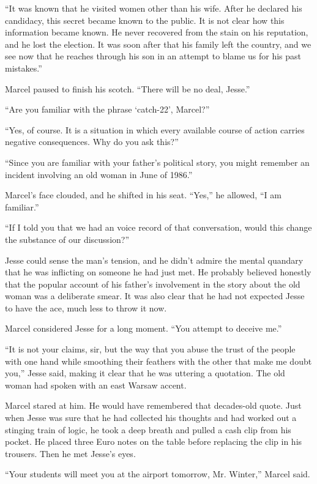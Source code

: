 \documentclass[12pt]{book}
\begin{document}
``It was known that he visited women other than his wife.  After he declared his candidacy, this secret became known to the public.  It is not clear how this information became known.  He never recovered from the stain on his reputation, and he lost the election.  It was soon after that his family left the country, and we see now that he reaches through his son in an attempt to blame us for his past mistakes.''

Marcel paused to finish his scotch.  ``There will be no deal, Jesse.''

``Are you familiar with the phrase `catch-22', Marcel?''

``Yes, of course.  It is a situation in which every available course of action carries negative consequences.  Why do you ask this?''

``Since you are familiar with your father's political story, you might remember an incident involving an old woman in June of 1986.''

Marcel's face clouded, and he shifted in his seat.  ``Yes,'' he allowed, ``I am familiar.''

``If I told you that we had an voice record of that conversation, would this change the substance of our discussion?''

Jesse could sense the man's tension, and he didn't admire the mental quandary that he was inflicting on someone he had just met.  He probably believed honestly that the popular account of his father's involvement in the story about the old woman was a deliberate smear.  It was also clear that he had not expected Jesse to have the ace, much less to throw it now.

Marcel considered Jesse for a long moment.  ``You attempt to deceive me.''

``It is not your claims, sir, but the way that you abuse the trust of the people with one hand while smoothing their feathers with the other that make me doubt you,'' Jesse said, making it clear that he was uttering a quotation.  The old woman had spoken with an east Warsaw accent.

Marcel stared at him.  He would have remembered that decades-old quote.  Just when Jesse was sure that he had collected his thoughts and had worked out a stinging train of logic, he took a deep breath and pulled a cash clip from his pocket.  He placed three Euro notes on the table before replacing the clip in his trousers.  Then he met Jesse's eyes.

``Your students will meet you at the airport tomorrow, Mr. Winter,'' Marcel said.
\end{document}
